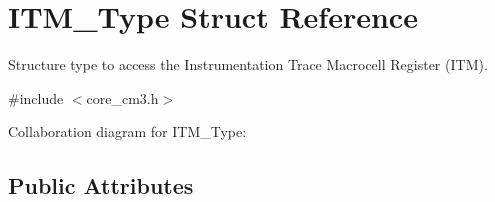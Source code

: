 \hypertarget{structITM__Type}{}\section{I\+T\+M\+\_\+\+Type Struct Reference}
\label{structITM__Type}


Structure type to access the Instrumentation Trace Macrocell Register (I\+TM).  




{\ttfamily \#include $<$core\+\_\+cm3.\+h$>$}



Collaboration diagram for I\+T\+M\+\_\+\+Type\+:
\subsection*{Public Attributes}
